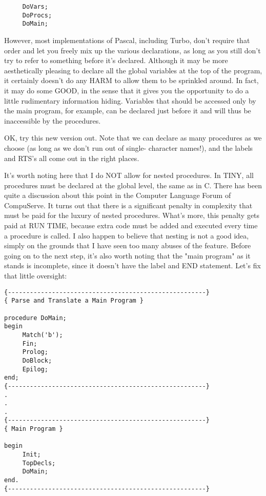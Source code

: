 \begin{verbatim}
     DoVars;
     DoProcs;
     DoMain;
\end{verbatim}

However, most implementations of Pascal, including Turbo, don't require  that  order  and  let  you  freely  mix up  the  various declarations, as  long  as  you  still  don't  try to  refer  to something  before  it's  declared. Although  it  may  be  more aesthetically pleasing to declare all the global variables at the top of the  program, it  certainly  doesn't do any HARM to allow them to be sprinkled around. In  fact, it may do some GOOD, in the  sense  that it gives you the  opportunity  to  do  a  little rudimentary  information  hiding. Variables  that  should  be accessed only by the main program, for example, can  be declared just before it and will thus be inaccessible by the procedures.

OK, try this new version out. Note that we  can  declare as many procedures as we choose (as long  as  we don't run out of single- character names!), and the  labels  and RTS's all come out in the right places.

It's  worth  noting  here  that  I  do   NOT   allow  for  nested procedures. In TINY, all procedures must  be  declared  at  the global level, the  same  as  in  C. There  has  been  quite a discussion about this point in  the  Computer  Language  Forum of CompuServe. It turns out that there is a significant  penalty in complexity that must be paid for the luxury of nested procedures. What's  more, this  penalty gets paid at RUN TIME, because extra code must be added and executed every time a procedure is called. I also happen to believe that nesting is not a good  idea, simply on the grounds that I have seen too many abuses of the feature. Before going on to the next step, it's also worth noting that the "main program" as it stands  is incomplete, since it doesn't have the label and END statement. Let's fix that little oversight:

\begin{verbatim}
{------------------------------------------------------}
{ Parse and Translate a Main Program }

procedure DoMain;
begin
     Match('b');
     Fin;
     Prolog;
     DoBlock;
     Epilog;
end;
{------------------------------------------------------}
.
.
.
{------------------------------------------------------}
{ Main Program }

begin
     Init;
     TopDecls;
     DoMain;
end.
{------------------------------------------------------}
\end{verbatim}

